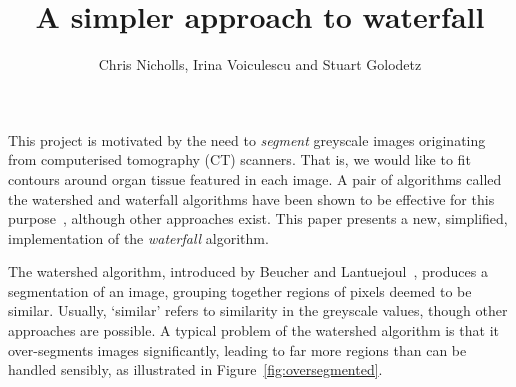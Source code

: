 \documentclass{ouclprgsc}
\title{\LARGE \bf
A simpler approach to waterfall
}
\author{Chris Nicholls, Irina Voiculescu and Stuart Golodetz
}
\institute{Oxford University Computing Laboratory}
\begin{document}
\maketitle
\pagestyle{empty}

\iffalse
@@@

 - segmentation is
 - waterfall algorithm for segmentation
 - existing implementation (arguably overly complicated)
 - we have a better, simpler one
 - we will illustrate it on CT scans

It is useful to be able to identify particular features in a set of
images automatically. One application is in the treatment of cancer,
where algorithms can be used to aid the detection and classification
of organ and tumour tissue. This is the main motivation for this
project, although the algorithm presented is a generic one, with many
applications.
\fi

 This project is motivated by the need to {\em segment\/} greyscale
 images originating from computerised tomography (CT) scanners. That
 is, we would like to fit contours around organ tissue featured in
 each image. A pair of algorithms called the watershed and waterfall
 algorithms have been shown to be effective for this
 purpose~\cite{golodetz}, although other approaches exist. This paper
 presents a new, simplified, implementation of the {\em waterfall\/}
 algorithm.

The watershed algorithm, introduced by Beucher and
Lantuejoul~\cite{beucher79}, produces a segmentation of an image,
grouping together regions of pixels deemed to be similar. Usually,
`similar' refers to similarity in the greyscale values, though other
approaches are possible. A typical problem of the watershed algorithm
is that it over-segments images significantly, leading to far more
regions than can be handled sensibly, as illustrated in
Figure~\ref{fig:oversegmented}.
\end{document}
